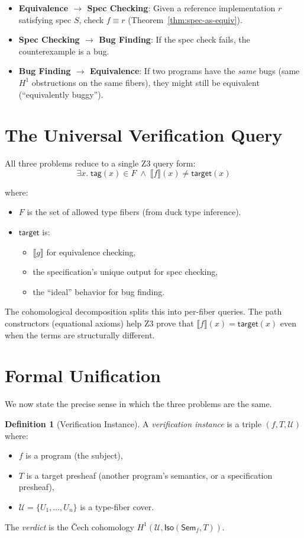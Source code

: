 \documentclass[11pt,a4paper]{report}
\theoremstyle{definition}
\newtheorem{definition}{Definition}[chapter]
\theoremstyle{plain}
\newcommand{\den}[1]{\llbracket #1 \rrbracket}
\newcommand{\covers}{\mathcal{U}}
\newcommand{\Sem}{\mathsf{Sem}}
\newcommand{\Iso}{\mathsf{Iso}}
\newcommand{\Hone}{H^1}
\begin{document}
\begin{itemize}
  \item \textbf{Equivalence $\to$ Spec Checking}: Given a reference
    implementation $r$ satisfying spec $S$, check $f \equiv r$
    (Theorem~\ref{thm:spec-as-equiv}).
  \item \textbf{Spec Checking $\to$ Bug Finding}: If the spec check
    fails, the counterexample is a bug.
  \item \textbf{Bug Finding $\to$ Equivalence}: If two programs have
    the \emph{same} bugs (same $\Hone$ obstructions on the same
    fibers), they might still be equivalent (``equivalently buggy'').
\end{itemize}

\section{The Universal Verification Query}

All three problems reduce to a single Z3 query form:
\[
  \exists x.\; \mathsf{tag}(x) \in F \;\land\;
  \den{f}(x) \neq \mathsf{target}(x)
\]

where:
\begin{itemize}
  \item $F$ is the set of allowed type fibers (from duck type
    inference).
  \item $\mathsf{target}$ is:
    \begin{itemize}
      \item $\den{g}$ for equivalence checking,
      \item the specification's unique output for spec checking,
      \item the ``ideal'' behavior for bug finding.
    \end{itemize}
\end{itemize}

The cohomological decomposition splits this into per-fiber queries.
The path constructors (equational axioms) help Z3 prove that
$\den{f}(x) = \mathsf{target}(x)$ even when the terms are
structurally different.

\section{Formal Unification}

We now state the precise sense in which the three problems are the
same.

\begin{definition}[Verification Instance]
A \emph{verification instance} is a triple $(f, T, \covers)$ where:
\begin{itemize}
  \item $f$ is a program (the subject),
  \item $T$ is a target presheaf (another program's semantics, or a
    specification presheaf),
  \item $\covers = \{U_1, \ldots, U_n\}$ is a type-fiber cover.
\end{itemize}
The \emph{verdict} is the \v{C}ech cohomology
$\Hone(\covers, \Iso(\Sem_f, T))$.
\end{definition}
\end{document}
